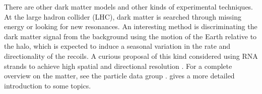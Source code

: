 There are other dark matter models and other kinds of experimental techniques.
At the large hadron collider (LHC), dark matter is searched through missing
energy or looking for new resonances. An interesting method is discriminating
the dark matter signal from the background using the motion of the Earth
relative to the halo, which is expected to induce a seasonal variation in the
rate and directionality of the recoils. A curious proposal of this kind
considered using RNA strands to achieve high spatial and directional resolution
\cite{drukier2015}. For a complete overview on the matter, see the particle
data group \cite[sec.~27]{zyla2020}. \cite[ch.~1]{savarese2018} gives a more
detailed introduction to some topics.

